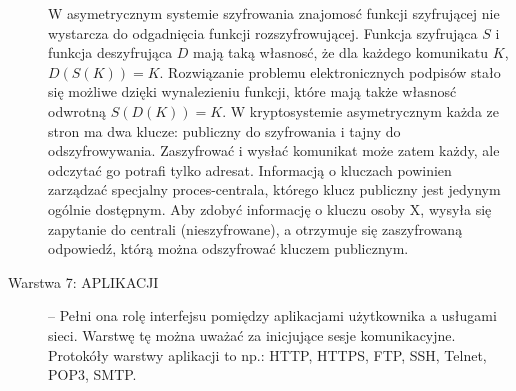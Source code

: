 \documentclass[a4paper,11pt]{article}
\begin{document}
\begin{description}
W asymetrycznym systemie szyfrowania znajomosć funkcji szyfrującej nie wystarcza do odgadnięcia funkcji rozszyfrowującej. Funkcja szyfrująca $S$ i funkcja deszyfrująca $D$ mają taką własnosć, że dla każdego komunikatu $K$, $D(S(K)) = K$. Rozwiązanie problemu elektronicznych podpisów stało się możliwe dzięki wynalezieniu funkcji, które mają także własnosć odwrotną $S(D(K)) = K$. W kryptosystemie asymetrycznym każda ze stron ma dwa klucze: publiczny do szyfrowania i tajny do odszyfrowywania. Zaszyfrować i wysłać komunikat może zatem każdy, ale odczytać go potrafi tylko adresat. Informacją o kluczach powinien zarządzać specjalny proces-centrala, którego klucz publiczny jest jedynym ogólnie dostępnym. Aby zdobyć informację o kluczu osoby X, wysyła się zapytanie do centrali (nieszyfrowane), a otrzymuje się zaszyfrowaną odpowiedź, którą można odszyfrować kluczem publicznym. 
\item[Warstwa 7: APLIKACJI ] -- Pełni ona rolę interfejsu pomiędzy aplikacjami użytkownika a usługami sieci. Warstwę tę można uważać za inicjujące sesje komunikacyjne. Protokóły warstwy aplikacji to np.: HTTP, HTTPS, FTP, SSH, Telnet, POP3, SMTP. 
\end{description}
\end{document}
